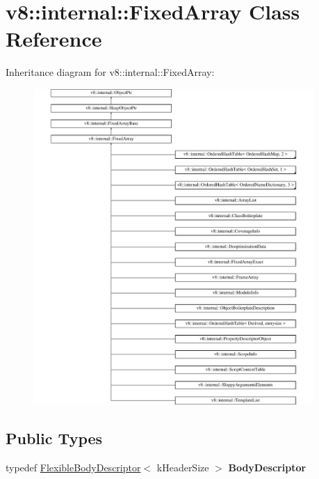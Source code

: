 \hypertarget{classv8_1_1internal_1_1FixedArray}{}\section{v8\+:\+:internal\+:\+:Fixed\+Array Class Reference}
\label{classv8_1_1internal_1_1FixedArray}
Inheritance diagram for v8\+:\+:internal\+:\+:Fixed\+Array\+:\begin{figure}[H]
\begin{center}
\leavevmode
\includegraphics[height=12.000000cm]{classv8_1_1internal_1_1FixedArray}
\end{center}
\end{figure}
\subsection*{Public Types}
\begin{DoxyCompactItemize}
\item 
\mbox{\label{classv8_1_1internal_1_1FixedArray_a7e3d1190aa4d17df2ee5508b19319050}} 
typedef \mbox{\hyperlink{classv8_1_1internal_1_1FlexibleBodyDescriptor}{Flexible\+Body\+Descriptor}}$<$ k\+Header\+Size $>$ {\bfseries Body\+Descriptor}
\end{DoxyCompactItemize}
